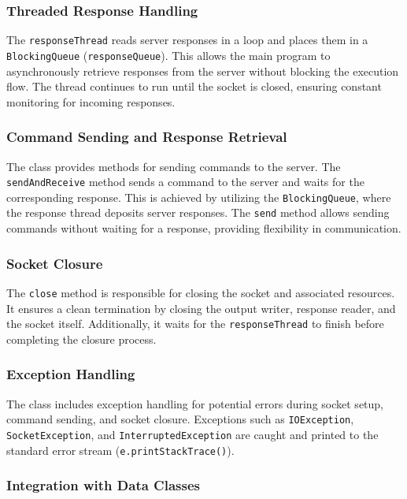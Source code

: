 \documentclass{article}
\begin{document}
\subsubsection{Threaded Response Handling}

The \texttt{responseThread} reads server responses in a loop and places them in a \texttt{BlockingQueue} (\texttt{responseQueue}). This allows the main program to asynchronously retrieve responses from the server without blocking the execution flow. The thread continues to run until the socket is closed, ensuring constant monitoring for incoming responses.

\subsubsection{Command Sending and Response Retrieval}

The class provides methods for sending commands to the server. The \texttt{sendAndReceive} method sends a command to the server and waits for the corresponding response. This is achieved by utilizing the \texttt{BlockingQueue}, where the response thread deposits server responses. The \texttt{send} method allows sending commands without waiting for a response, providing flexibility in communication.

\subsubsection{Socket Closure}

The \texttt{close} method is responsible for closing the socket and associated resources. It ensures a clean termination by closing the output writer, response reader, and the socket itself. Additionally, it waits for the \texttt{responseThread} to finish before completing the closure process.

\subsubsection{Exception Handling}

The class includes exception handling for potential errors during socket setup, command sending, and socket closure. Exceptions such as \texttt{IOException}, \texttt{SocketException}, and \texttt{InterruptedException} are caught and printed to the standard error stream (\texttt{e.printStackTrace()}).

\subsubsection{Integration with Data Classes}
\end{document}

